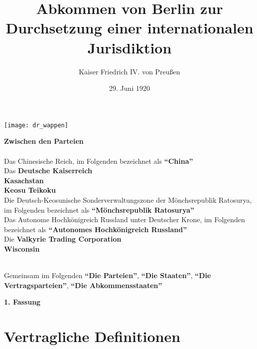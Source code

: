 \documentclass{article}
\title{Abkommen von Berlin zur Durchsetzung einer internationalen Jurisdiktion}
\author{Kaiser Friedrich IV. von Preußen}
\date{29. Juni 1920}
\begin{document}
\maketitle
\begin{center}
    \texttt{[image: dr\_wappen]}
\end{center}
\begin{center}
    \textbf{Zwischen den Parteien\\}\textbf{\\}
    Das Chinesische Reich, im Folgenden bezeichnet als \textbf{``China''\\}
    Das \textbf{Deutsche Kaiserreich\\}
    \textbf{Kasachstan\\}
    \textbf{Keosu Teikoku\\}
    Die Deutsch-Keosunische Sonderverwaltungszone der Mönchsrepublik Ratosurya, im Folgenden bezeichnet als \textbf{``Mönchsrepublik Ratosurya''\\}
    Das Autonome Hochkönigreich Russland unter Deutscher Krone, im Folgenden bezeichnet als \textbf{``Autonomes Hochkönigreich Russland''\\}
    Die \textbf{Valkyrie Trading Corporation\\}
    \textbf{Wisconsin\\}\textbf{\\}

    Gemeinsam im Folgenden \textbf{``Die Parteien''}, \textbf{``Die Staaten''}, \textbf{``Die Vertragsparteien''}, \textbf{``Die Abkommensstaaten''}
\end{center}
\newpage
{}
\vspace*{\fill}
\begin{Center}
\textbf{1. Fassung}
\vspace*{\fill}
\end{Center}
\newpage
\tableofcontents
\newpage
\section{Vertragliche Definitionen}
\end{document}
